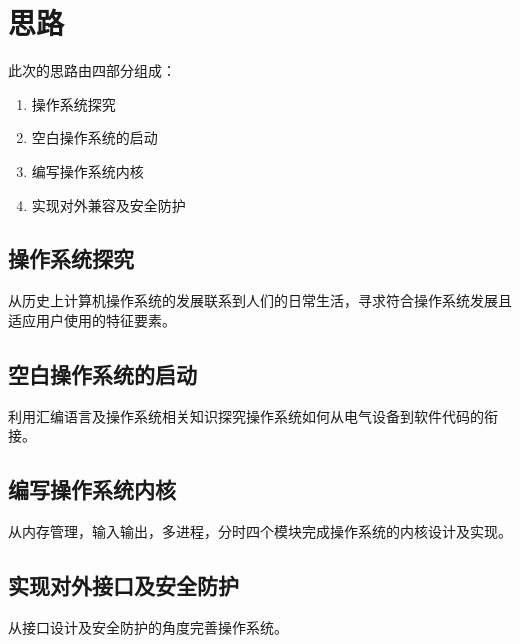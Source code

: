 \chapter{思路}

此次的思路由四部分组成：
\begin{enumerate}
    \item 操作系统探究
    \item 空白操作系统的启动
    \item 编写操作系统内核
    \item 实现对外兼容及安全防护
    \end{enumerate}

\section{操作系统探究}
从历史上计算机操作系统的发展联系到人们的日常生活，寻求符合操作系统发展且适应用户使用的特征要素。

\section{空白操作系统的启动}
利用汇编语言及操作系统相关知识探究操作系统如何从电气设备到软件代码的衔接。

\section{编写操作系统内核}
从内存管理，输入输出，多进程，分时四个模块完成操作系统的内核设计及实现。

\section{实现对外接口及安全防护}
从接口设计及安全防护的角度完善操作系统。